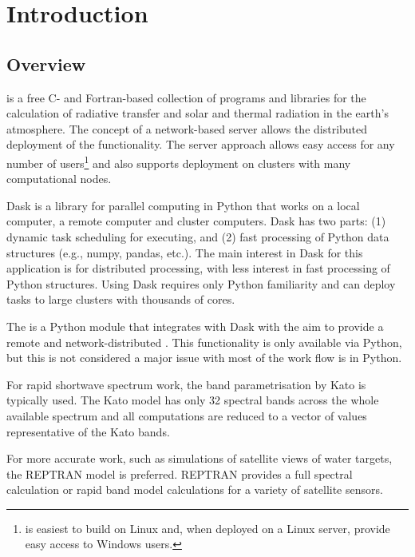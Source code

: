 
\chapter{Introduction}
\label{chap:Introduction}

\section{Overview}
\label{sec:introductionOverview}

\libradtran{} \cite{EmdeLibRadtran2016,libRadtran2005} is a free C- and Fortran-based collection of programs and libraries for the calculation of radiative transfer and solar and thermal radiation in the earth's atmosphere.
The concept of a network-based \libradtran{} server allows the  distributed deployment of the \libradtran{} functionality. The server approach allows easy access for any number of users\footnote{\libradtran{} is easiest to build on Linux and, when deployed on a Linux server, provide easy access to Windows users.} and also supports deployment on clusters with many computational nodes.

Dask \cite{daskhomepage2020} is a library for parallel computing in Python that works on a local computer, a remote computer and cluster computers.
Dask has two parts: (1) dynamic task scheduling for executing, and (2) fast processing of Python data structures (e.g., numpy, pandas, etc.).  The main interest in Dask for this application is for distributed  processing, with less interest in fast processing of Python structures. Using Dask requires only Python familiarity and can deploy tasks to large clusters with thousands of cores.

The \libraddask{}  is a Python module that integrates \libradtran{} with Dask with the aim to provide a remote and network-distributed \libradtran{}. This functionality is only available via Python, but this is not considered a major issue with most of the work flow is in Python.

For rapid shortwave spectrum work, the band parametrisation by Kato is typically used.
The Kato model has only 32 spectral bands across the whole available spectrum and all computations
are reduced to a vector of values representative of the Kato bands.

For more accurate work, such as simulations of satellite views of water targets, the REPTRAN
model is preferred. REPTRAN provides a full spectral calculation or rapid band model calculations
for a variety of satellite sensors.

